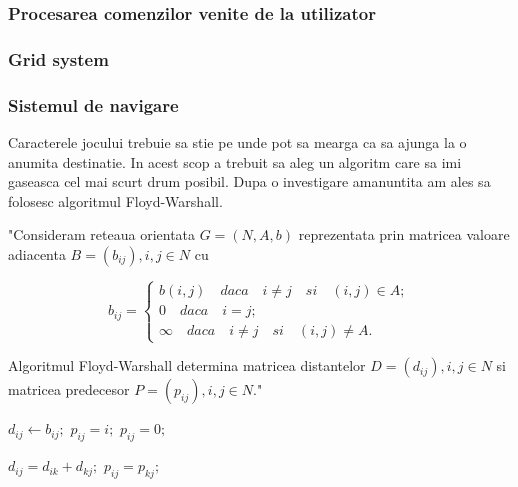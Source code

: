\documentclass[12pt, a4paper]{article}
\begin{document}
	\subsubsection{Procesarea comenzilor venite de la utilizator}
	
	\subsubsection{Grid system}
	
	\subsubsection{Sistemul de navigare}
	
	Caracterele jocului trebuie sa stie pe unde pot sa mearga ca sa ajunga la o anumita destinatie. In acest scop a trebuit sa aleg un algoritm care sa imi gaseasca cel mai scurt drum posibil. Dupa o investigare amanuntita am ales sa folosesc algoritmul Floyd-Warshall.
	
	"Consideram reteaua orientata $G = (N, A, b)$ reprezentata prin matricea valoare adiacenta $B = (b_{ij}), i, j \in N$ cu
	
	\begin{equation*}
		b_{ij} = \begin{cases}
			b(i, j) \quad daca \quad i \neq j \quad si \quad (i, j) \in A; \\
			0 \quad daca \quad i = j; \\
			\infty \quad daca \quad i \neq j \quad si \quad (i, j) \neq A.
		\end{cases}
	\end{equation*}

	Algoritmul Floyd-Warshall determina matricea distantelor $D = (d_{ij}), i, j \in N$ si matricea predecesor $P = (p_{ij}), i, j \in N$." \cite{grafuriAnul2}
	
	\begin{algorithmic}
					\State $d_{ij} \gets b_{ij};$
						\State $p_{ij} = i;$
					\Else
						\State $p_{ij} = 0;$
					\EndIf
				\EndFor
			\EndFor
			
							\State $d_{ij} = d_{ik} + d_{kj};$
							\State $p_{ij} = p_{kj};$
						\EndIf
					\EndFor
				\EndFor
			\EndFor
		\EndFunction
	\end{algorithmic}
\end{document}
